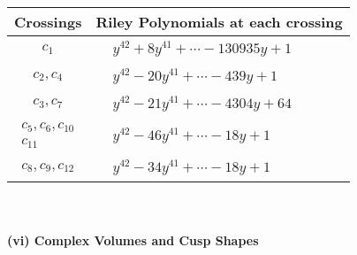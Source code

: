 \documentclass[1p]{elsarticle_modified}
\theoremstyle{definition}
\begin{document}
\begin{tabular}{m{50pt}|m{274pt}}
Crossings & \hspace{64pt}Riley Polynomials at each crossing \\
\hline $$\begin{aligned}c_{1}\end{aligned}$$&$\begin{aligned}
&y^{42}+8 y^{41}+\cdots-130935 y+1
\end{aligned}$\\
\hline $$\begin{aligned}c_{2},c_{4}\end{aligned}$$&$\begin{aligned}
&y^{42}-20 y^{41}+\cdots-439 y+1
\end{aligned}$\\
\hline $$\begin{aligned}c_{3},c_{7}\end{aligned}$$&$\begin{aligned}
&y^{42}-21 y^{41}+\cdots-4304 y+64
\end{aligned}$\\
\hline $$\begin{aligned}c_{5},c_{6},c_{10}\\c_{11}\end{aligned}$$&$\begin{aligned}
&y^{42}-46 y^{41}+\cdots-18 y+1
\end{aligned}$\\
\hline $$\begin{aligned}c_{8},c_{9},c_{12}\end{aligned}$$&$\begin{aligned}
&y^{42}-34 y^{41}+\cdots-18 y+1
\end{aligned}$\\
\hline
\end{tabular}\\~\\
\newpage\flushleft \textbf{(vi) Complex Volumes and Cusp Shapes}
\end{document}
